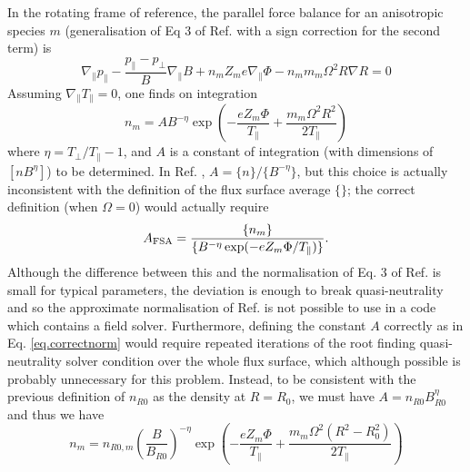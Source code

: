  In the rotating frame of reference, the parallel
force balance for an anisotropic species $m$ (generalisation of Eq 3 of Ref. \cite{Reinke12} with a sign correction for the second term)
is 
\begin{equation}
\nabla_\parallel p_\parallel - \frac{p_\parallel - p_\perp}{B}\nabla_\parallel B + n_m Z_m e \nabla_\parallel \Phi - n_m m_m \Omega^2 R \nabla R = 0
\end{equation}  
Assuming $\nabla_\parallel T_\parallel = 0$, one finds on integration
\begin{equation}
n_m = A B^{-\eta} \exp\left(-\frac{e Z_m \Phi}{T_\parallel} + \frac{m_m \Omega^2 R^2}{2 T_\parallel}\right)
\end{equation}
where $\eta = T_\perp/T_\parallel - 1$, and $A$ is a constant of integration (with dimensions of $[n B^{\eta}]$) to be determined. 
In Ref. \cite{Reinke12}, $A = \{n\}/\{B^{-\eta}\}$, but this choice is actually 
inconsistent with the definition of the flux surface average $\{ \}$; the correct definition (when $\Omega = 0$) would actually require
\begin{equation}
A_{\rm FSA}  = \frac{\{n_m\}}{\{B^{-\eta}\exp(-{e Z_m \Phi / T_\parallel})\}}. 
\label{eq.correctnorm}
\end{equation}
Although the difference between this and the normalisation of Eq. 3 of Ref. \cite{Reinke12} is small for typical parameters, the deviation
is enough to break quasi-neutrality and so the approximate normalisation of Ref. \cite{Reinke12} is not possible
to use in a code which contains a field solver.  Furthermore, defining the constant $A$ correctly as in Eq. \ref{eq.correctnorm} 
would require repeated iterations of the root finding quasi-neutrality solver condition over the whole flux surface, 
which although possible is probably unnecessary for this problem.
Instead, to be consistent with the previous definition of $n_{R0}$ as the density at $R=R_{0}$, we must have $A = n_{R0} B_{R0}^\eta$  
and thus we have
\begin{equation}
n_m = n_{R0,m} \left(\frac{B}{B_{R0}}\right)^{-\eta} \exp\left(-\frac{e Z_m \Phi}{T_\parallel} + \frac{m_m \Omega^2 (R^2-R_0^2)}{2 T_\parallel}\right)
\end{equation}

